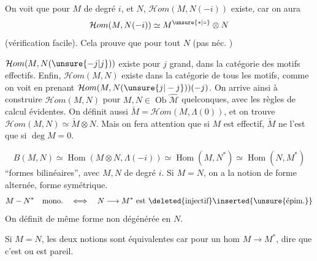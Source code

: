 On voit que pour  $M$ de degré $i$, et  $N$, $\mathcal Hom(M,N(-i))$ existe, car on aura
\[
\mathcal Hom(M,N(-i))\simeq M^{\unsure{*|\circ}}\otimes N
\]
(vérification facile).  Cela prouve que pour tout $N$ (pas néc. )

$\mathcal Hom(M,N(\unsure{-j|j}))$ existe pour $j$ grand, dans la catégorie des motifs effectifs. Enfin, $\mathcal Hom(M,N)$ existe dans la catégorie de tous les motifs, comme on voit en prenant $\mathcal Hom(M,N(\unsure{j|-j}))(-j)$. On arrive ainsi à construire $\mathcal Hom(M,N)$ pour $M,N\in\operatorname{Ob}\widehat{\mathcal M}$ quelconques, avec les règles de calcul évidentes. On définit aussi $\check M=\mathcal Hom(M,\Lambda(0))$, et on trouve $\mathcal Hom(M,N)\simeq\check M\otimes N$. Mais on fera attention que si $M$ est effectif, $\check M$ ne l'est que si $\deg M=0$.

\[
B(M,N)\simeq\operatorname{Hom}(M\otimes N,\Lambda(-i))\simeq\operatorname{Hom}(M,N^{*})\simeq\operatorname{Hom}(N,M^{*})
\]
``formes bilinéaires'', avec $M,N$ de degré $i$.
Si $M=N$, on a la notion de forme alternée, forme symétrique.
\[
M\mathbin{-}N^{*}\quad\text{mono.}\quad\Longleftrightarrow\quad N\longrightarrow M^{*}\text{ est }\deleted{\text{injectif}}\inserted{\text{\unsure{épim.}}}
\]
On définit de même forme non dégénérée en $N$.

Si $M=N$, les deux notions sont équivalentes car  pour un hom $M\longrightarrow M^{*}$, dire que c'est  ou    est pareil.

